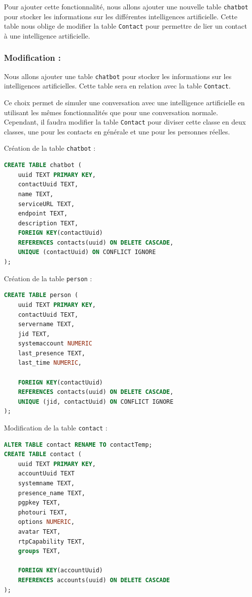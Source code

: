 \documentclass[a4paper,11pt]{article}
\begin{document}
Pour ajouter cette fonctionnalité, nous allons ajouter une nouvelle table \texttt{chatbot} pour stocker les informations sur les différentes intelligences artificielle. Cette table nous oblige de modifier la table \texttt{Contact} pour permettre de lier un contact à une intelligence artificielle.

\subsubsection*{Modification :}

Nous allons ajouter une table \texttt{chatbot} pour stocker les informations sur les intelligences artificielles. Cette table sera en relation avec la table \texttt{Contact}.

Ce choix permet de simuler une conversation avec une intelligence artificielle en utilisant les mêmes fonctionnalités que pour une conversation normale. Cependant, il faudra modifier la table \texttt{Contact} pour diviser cette classe en deux classes, une pour les contacts en générale et une pour les personnes réelles.

Création de la table \texttt{chatbot} :

\begin{lstlisting}[language=SQL]
CREATE TABLE chatbot (
	uuid TEXT PRIMARY KEY,
	contactUuid TEXT,
	name TEXT,
	serviceURL TEXT,
	endpoint TEXT,
	description TEXT,
	FOREIGN KEY(contactUuid) 
	REFERENCES contacts(uuid) ON DELETE CASCADE,
	UNIQUE (contactUuid) ON CONFLICT IGNORE
);
\end{lstlisting}

Création de la table \texttt{person} :

\begin{lstlisting}[language=SQL]
CREATE TABLE person (
	uuid TEXT PRIMARY KEY,
	contactUuid TEXT,
	servername TEXT,
	jid TEXT,
	systemaccount NUMERIC
	last_presence TEXT,
	last_time NUMERIC,

	FOREIGN KEY(contactUuid) 
	REFERENCES contacts(uuid) ON DELETE CASCADE,
	UNIQUE (jid, contactUuid) ON CONFLICT IGNORE
);
\end{lstlisting}

Modification de la table \texttt{contact} :

\begin{lstlisting}[language=SQL]
ALTER TABLE contact RENAME TO contactTemp;
CREATE TABLE contact (
	uuid TEXT PRIMARY KEY,
	accountUuid TEXT
	systemname TEXT,
	presence_name TEXT,
	pgpkey TEXT,
	photouri TEXT,
	options NUMERIC,
	avatar TEXT,
	rtpCapability TEXT,
	groups TEXT,

	FOREIGN KEY(accountUuid)
	REFERENCES accounts(uuid) ON DELETE CASCADE
);
\end{lstlisting}
\end{document}
